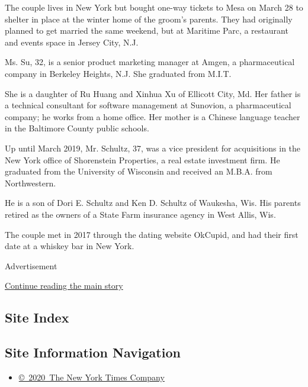 The couple lives in New York but bought one-way tickets to Mesa on March
28 to shelter in place at the winter home of the groom's parents. They
had originally planned to get married the same weekend, but at Maritime
Parc, a restaurant and events space in Jersey City, N.J.

Ms. Su, 32, is a senior product marketing manager at Amgen, a
pharmaceutical company in Berkeley Heights, N.J. She graduated from
M.I.T.

She is a daughter of Ru Huang and Xinhua Xu of Ellicott City, Md. Her
father is a technical consultant for software management at Sunovion, a
pharmaceutical company; he works from a home office. Her mother is a
Chinese language teacher in the Baltimore County public schools.

Up until March 2019, Mr. Schultz, 37, was a vice president for
acquisitions in the New York office of Shorenstein Properties, a real
estate investment firm. He graduated from the University of Wisconsin
and received an M.B.A. from Northwestern.

He is a son of Dori E. Schultz and Ken D. Schultz of Waukesha, Wis. His
parents retired as the owners of a State Farm insurance agency in West
Allis, Wis.

The couple met in 2017 through the dating website OkCupid, and had their
first date at a whiskey bar in New York.

Advertisement

\protect\hyperlink{after-bottom}{Continue reading the main story}

\hypertarget{site-index}{%
\subsection{Site Index}\label{site-index}}

\hypertarget{site-information-navigation}{%
\subsection{Site Information
Navigation}\label{site-information-navigation}}

\begin{itemize}
\tightlist
\item
  \href{https://help.nytimes3xbfgragh.onion/hc/en-us/articles/115014792127-Copyright-notice}{©~2020~The
  New York Times Company}
\end{itemize}

